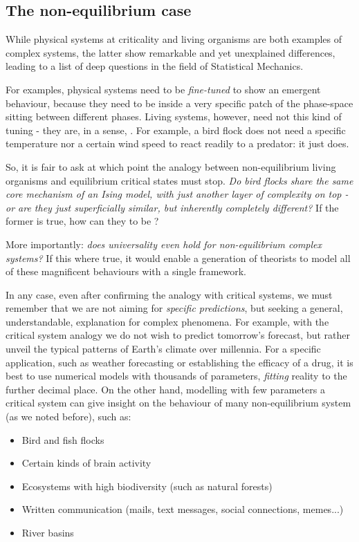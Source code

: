 \documentclass[../../main.tex]{subfiles}
\begin{document}
\subsection{The non-equilibrium case}
While physical systems at criticality and living organisms are both examples of complex systems, the latter show remarkable and yet unexplained differences, leading to a list of deep questions in the field of Statistical Mechanics.

\medskip

For examples, physical systems need to be \textit{fine-tuned} to show an emergent behaviour, because they need to be inside a very specific patch of the phase-space sitting between different phases. Living systems, however, need not this kind of tuning - they are, in a sense, . For example, a bird flock does not need a specific temperature nor a certain wind speed to react readily to a predator: it just does.

\medskip

So, it is fair to ask at which point the analogy between non-equilibrium living organisms and equilibrium critical states must stop. \textit{Do bird flocks share the same core mechanism of an Ising model, with just another layer of complexity on top - or are they just superficially similar, but inherently completely different?} If the former is true, how can they  to be ?

\medskip

More importantly: \textit{does universality even hold for non-equilibrium complex systems?} If this where true, it would enable a generation of theorists to model all of these magnificent behaviours with a single framework.

\medskip

In any case, even after confirming the analogy with critical systems, we must remember that we are not aiming for \textit{specific predictions}, but seeking a general, understandable, explanation for complex phenomena. For example, with the critical system analogy we do not wish to predict tomorrow's forecast, but rather unveil the typical patterns of  Earth's climate over millennia. For a specific application, such as weather forecasting or establishing the efficacy of a drug, it is best to use numerical models with thousands of parameters, \textit{fitting} reality to the further decimal place. On the other hand, modelling with few parameters a critical system can give insight on the behaviour of many non-equilibrium system (as we noted before), such as:
\begin{itemize}
    \item Bird and fish flocks
    \item Certain kinds of brain activity
    \item Ecosystems with high biodiversity (such as natural forests)
    \item Written communication (mails, text messages, social connections, memes...)
    \item River basins
\end{itemize}
\end{document}
